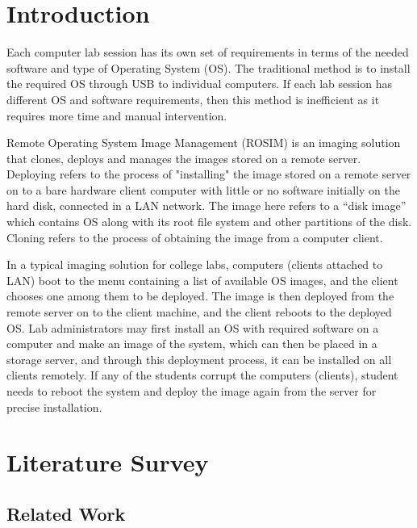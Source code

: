 \documentclass[a4paper,12pt]{article}
\begin{document}
\newpage    
        


\section{\fontsize{16pt}{1em} Introduction}
Each computer lab session has its own set of requirements in terms of the needed software and type of Operating System (OS). The traditional method is to install the required OS through USB to individual computers. If each lab session has different OS and software requirements, then this method is inefficient as it requires more time and manual intervention.


Remote Operating System Image Management (ROSIM) is an imaging solution that clones, deploys and manages the images stored on a remote server. Deploying refers to the process of "installing" the image stored on a remote server on to  a bare hardware client computer with little or no software initially on the hard disk, connected in a LAN  network. The image here refers to a “disk image” which contains OS along with its root file system and other partitions of the disk. Cloning refers to the process of obtaining the image from a computer client. 

In a typical imaging solution for college labs, computers (clients attached to LAN) boot to the menu containing a list of available OS images, and the client chooses one among them to be deployed. The image is then deployed from the remote server on to the client machine, and the client reboots to the deployed OS. Lab administrators may first install an OS with required software on a computer and make an image of the system, which can then be placed in a storage server, and through this deployment process, it can be installed on all clients remotely. If any of the students corrupt the computers (clients), student needs to reboot the system and deploy the image again from the server for precise installation. 
\vspace{0.5cm}

\newpage
\section{\fontsize{16pt}{1em}  Literature Survey}


\subsection{ Related Work}
\end{document}
